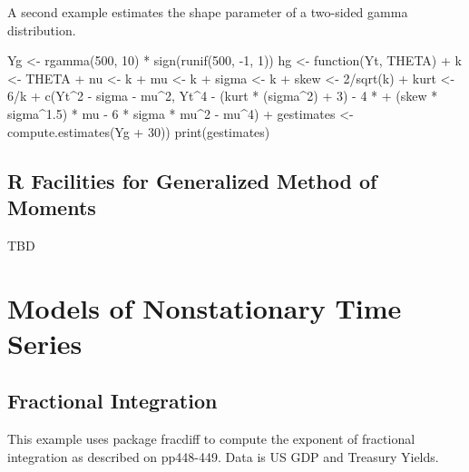 \documentclass[a4paper]{article}
\renewcommand{\~}{\perispomeni}%
\begin{document}
A second example estimates the shape parameter of a two-sided gamma distribution.
\begin{Schunk}
\begin{Sinput}
 Yg <- rgamma(500, 10) * sign(runif(500, -1, 1))
 hg <- function(Yt, THETA) {
+     k <- THETA
+     nu <- k
+     mu <- k
+     sigma <- k
+     skew <- 2/sqrt(k)
+     kurt <- 6/k
+     c(Yt^2 - sigma - mu^2, Yt^4 - (kurt * (sigma^2) + 3) - 4 * 
+         (skew * sigma^1.5) * mu - 6 * sigma * mu^2 - mu^4)
+ }
 gestimates <- compute.estimates(Yg %
+     30))
 print(gestimates)
\end{Sinput}
\end{Schunk}
\subsection{R Facilities for Generalized Method of Moments}
TBD
\section{Models of Nonstationary Time Series}
\subsection{Fractional Integration}
This example uses package fracdiff to compute the exponent of fractional integration as described on pp448-449.
Data is US GDP and Treasury Yields.
\begin{Schunk}
\end{Schunk}
\end{document}
